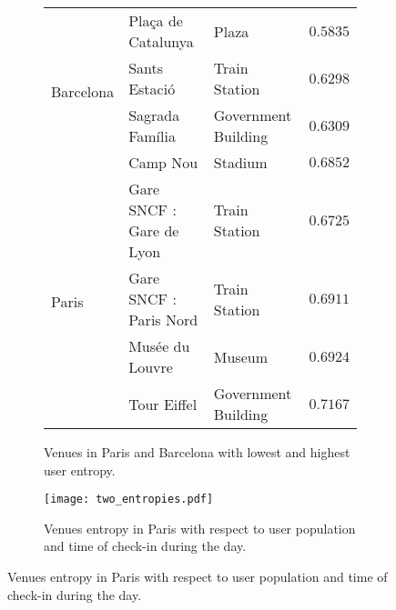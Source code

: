 \begin{figure}[p]
\begin{subfigure}{0.45\textheight}
\begin{tabular}{lllr}
	\multirow{4}{*}{Barcelona} & Plaça de Catalunya              & Plaza                    & $0.5835$ \\
	                           & Sants Estació                   & Train Station            & $0.6298$ \\
	                           & Sagrada Família                 & Government Building      & $0.6309$ \\
	                           & Camp Nou                        & Stadium                  & $0.6852$ \\
	\midrule
	\multirow{4}{*}{Paris}     & Gare SNCF : Gare de Lyon        & Train Station            & $0.6725$ \\
	                           & Gare SNCF : Paris Nord          & Train Station            & $0.6911$ \\
	                           & Musée du Louvre                 & Museum                   & $0.6924$ \\
	                           & Tour Eiffel                     & Government Building      & $0.7167$ \\
	\bottomrule
\end{tabular}
\caption{Venues in Paris and Barcelona with lowest and highest user
entropy.\label{tab:entropy}}
\end{subfigure}

\begin{subfigure}{0.45\textheight} \centering
	\texttt{[image: two\_entropies.pdf]}
	\caption{Venues entropy in Paris with respect to user population and time of check-in
	during the day. \label{fig:two_entropies}}
\end{subfigure}
\end{figure}

